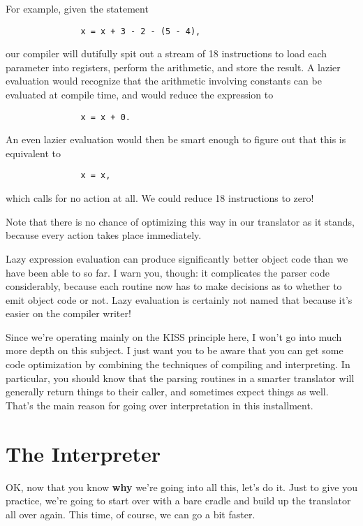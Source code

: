 For example, given the statement

\begin{verbatim}
               x = x + 3 - 2 - (5 - 4),
\end{verbatim}

our compiler will dutifully spit  out a stream of 18 instructions to load each parameter into  registers, perform  the arithmetic, and store the result. A lazier evaluation  would  recognize that the arithmetic involving constants can  be  evaluated  at compile time, and would reduce the expression to

\begin{verbatim}
               x = x + 0.
\end{verbatim}

An  even  lazier  evaluation would then be smart enough to figure out that this is equivalent to

\begin{verbatim}
               x = x,
\end{verbatim}

which  calls  for  no  action  at  all. We could reduce 18  instructions to zero!

Note that there is no chance of optimizing this way in our translator as it stands, because every action takes place immediately.

Lazy  expression  evaluation  can  produce  significantly  better object code than  we  have  been  able  to  so  far. I warn you, though: it complicates the parser code considerably, because each routine now has to make decisions as to whether  to  emit  object code or not. Lazy evaluation is certainly not named that because it's easier on the compiler writer!

Since we're operating mainly on  the KISS principle here, I won't go  into much more depth on this subject. I just want you to  be aware  that  you  can get some code optimization by combining the techniques of compiling and  interpreting. In  particular, you should know that the parsing  routines  in  a  smarter translator will generally  return  things  to  their  caller, and sometimes expect things as  well. That's  the main reason for going over interpretation in this installment.

\section{The Interpreter}

OK, now that you know {\bfseries why} we're going into all this, let's do it. Just to give you practice, we're going to start over with  a bare cradle and build up the translator all over again. This time, of course, we can go a bit faster.

